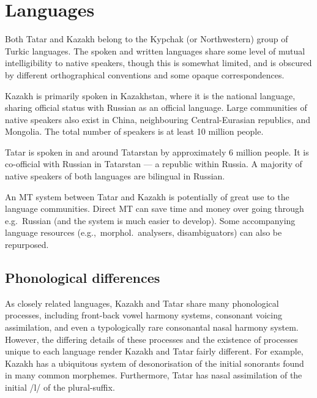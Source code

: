 \documentclass[a4paper,11pt]{article}
\begin{document}


\section{Languages}
\label{sec:lang}

Both Tatar and Kazakh belong to the Kypchak (or Northwestern) group of Turkic
languages.  The spoken and written languages share some level of mutual intelligibility to native 
speakers, though this is somewhat limited, and is obscured by different orthographical 
conventions and some opaque correspondences.

Kazakh is primarily spoken in Kazakhstan, where it is the national
language, sharing official status with Russian as an official language.
Large communities of native speakers also exist in China, neighbouring
Central-Eurasian republics, and Mongolia. The total number of speakers is at least 10 million people.

Tatar is spoken in and around Tatarstan by
approximately 6 million people. It is co-official with Russian in Tatarstan ---
a republic within Russia.  A majority of native speakers of both languages are bilingual in Russian. %

An MT system between Tatar and Kazakh is potentially of great use to the language communities.  Direct MT can save time and money over going through e.g.\ Russian (and the system is much easier to develop).  Some accompanying language resources (e.g.,\ morphol.\ analysers, disambiguators) can also be repurposed.

\subsection{Phonological differences}
As closely related languages, Kazakh and Tatar share many phonological processes, including 
front-back vowel harmony systems, consonant voicing assimilation, and even a typologically rare 
consonantal nasal harmony system.  However, the differing details of these processes and the existence of 
processes unique to each language render Kazakh and Tatar fairly different.  For example, Kazakh has a 
ubiquitous system of desonorisation of the initial sonorants found in many common morphemes.  Furthermore, Tatar 
has nasal assimilation of the initial /l/ of the plural-suffix.
\end{document}
